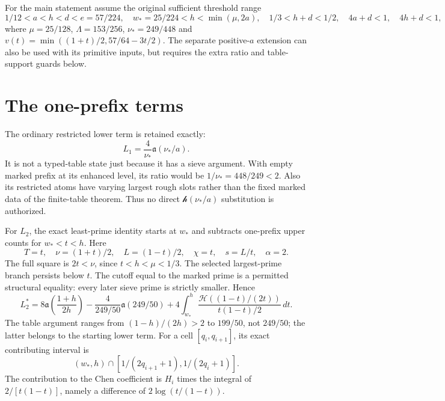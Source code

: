 \documentclass[11pt]{article}
\newcommand{\HH}{\mathcal H}
\newcommand{\hh}{\mathcal h}
\newcommand{\alow}{\mathfrak a}
\newcommand{\Lam}{\Lambda}
\begin{document}
For the main statement assume the original sufficient threshold range
\[
 1/12<a<h<d<e=57/224,\quad w_*=25/224<h<\min(\mu,2a),
 \quad 1/3<h+d<1/2,\quad 4a+d<1,\quad4h+d<1,
\]
where $\mu=25/128$, $\Lam=153/256$, $\nu_*=249/448$ and
$v(t)=\min((1+t)/2,57/64-3t/2)$.
The separate positive-$a$ extension can also be used with its primitive
inputs, but requires the extra ratio and table-support guards below.

\section*{The one-prefix terms}
The ordinary restricted lower term is retained exactly:
\[
 L_1=\frac4{\nu_*}\alow(\nu_*/a).
\]
It is not a typed-table state just because it has a sieve argument.
With empty marked prefix at its enhanced level, its ratio would be
$1/\nu_*=448/249<2$. Also its restricted atoms have varying largest
rough slots rather than the fixed marked data of the finite-table
theorem. Thus no direct $\hh(\nu_*/a)$ substitution is authorized.

For $L_2$, the exact least-prime identity starts at $w_*$ and subtracts
one-prefix upper counts for $w_*<t<h$. Here
\[
 T=t,\quad \nu=(1+t)/2,\quad L=(1-t)/2,\quad
 \chi=t,\quad s=L/t,\quad\alpha=2.
\]
The full square is $2t<\nu$, since $t<h<\mu<1/3$.
The selected largest-prime branch persists below $t$.
The cutoff equal to the marked prime is a permitted structural equality:
every later sieve prime is strictly smaller. Hence
\begin{equation}\label{eq:L2}
 L_2^*=8\alow\left(\frac{1+h}{2h}\right)
   -\frac4{249/50}\alow(249/50)
   +4\int_{w_*}^{h}\frac{\HH((1-t)/(2t))}{t(1-t)/2}\,dt.
\end{equation}
The table argument ranges from $(1-h)/(2h)>2$ to $199/50$, not
$249/50$; the latter belongs to the starting lower term.
For a cell $[q_i,q_{i+1}]$, its exact contributing interval is
\[
 (w_*,h)\cap[1/(2q_{i+1}+1),1/(2q_i+1)].
\]
The contribution to the Chen coefficient is $H_i$ times the integral
of $2/[t(1-t)]$, namely a difference of $2\log(t/(1-t))$.
\end{document}
